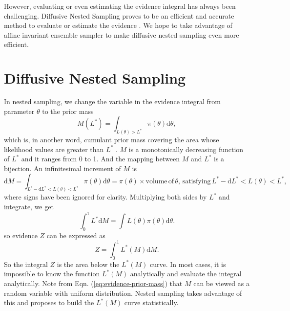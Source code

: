 \documentclass[letterpaper, preprint]{aastex}
\begin{document}
However, evaluating or even estimating the evidence integral has always been challenging. Diffusive Nested Sampling proves to be an efficient and accurate method to evaluate or estimate the evidence \citep{brewer11a}. We hope to take advantage of affine invariant ensemble sampler \citep{goodman10a} to make diffusive nested sampling even more efficient.


\section{Diffusive Nested Sampling}

In nested sampling, we change the variable in the evidence integral from parameter $\theta$ to the prior mass
\begin{equation}
M(L^*)=\int_{L(\theta)>L^*}\!\pi(\theta)\mathrm{d}\theta,
 \label{eq:prior-mass}
\end{equation}
which is, in another word, cumulant prior mass covering the area whose likelihood values are greater than $L^*$ \citep{skilling06a}. $M$ is a monotonically decreasing function of $L^*$ and it ranges from 0 to 1. And the mapping between $M$ and $L^*$ is a bijection. An infinitesimal increment of $M$ is
\begin{equation}
\mathrm{d}M=\int_{L^*-\mathrm{d}L^*<L(\theta)<L^*}\!\pi(\theta)\mathrm{d}\theta = \pi(\theta)\times \mathrm{volume\,of}\,\theta,\,\mathrm{satisfying}\, L^*-\mathrm{d}L^*<L(\theta)<L^*,
\label{eq:dM}
\end{equation}
where signs have been ignored for clarity. Multiplying both sides by $L^*$ and integrate, we get
\begin{equation}
\int^1_0\! L^*\mathrm{d}M=\int\!L(\theta)\pi(\theta)\mathrm{d}\theta.
\label{eq:int-dM}
\end{equation}
so evidence $Z$ can be expressed as
\begin{equation}
Z=\int^1_0\! L^*(M)\mathrm{d}M.
 \label{eq:evidence-prior-mass}
\end{equation}
So the integral $Z$ is the area below the $L^*(M)$ curve. In most cases, it is impossible to know the function $L^*(M)$ analytically and evaluate the integral analytically. Note from Eqn. (\ref{eq:evidence-prior-mass}) that $M$ can be viewed as a random variable with uniform distribution. Nested sampling takes advantage of this and proposes to build the $L^*(M)$ curve statistically.
\end{document}
